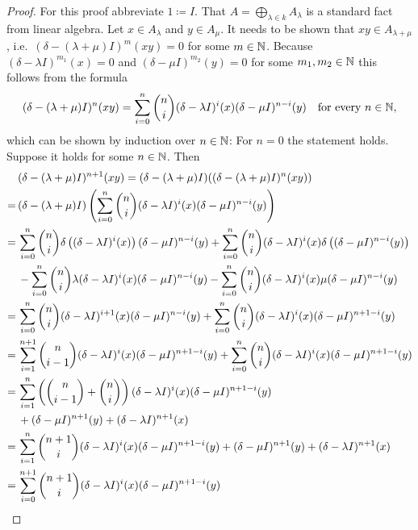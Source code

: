 \begin{proof}
 For this proof abbreviate $1 \coloneqq I$. That $A = \bigoplus_{\lambda \in k} A_\lambda$ is a standard fact from linear algebra. Let $x \in A_\lambda$ and $y \in A_\mu$. It needs to be shown that $xy \in A_{\lambda + \mu}$, i.e.\ $(\delta-(\lambda+\mu)I)^m(xy) = 0$ for some $m \in \mathbb{N}$. Because $(\delta-\lambda I)^{m_1}(x) = 0$ and $(\delta-\mu I)^{m_2}(y) = 0$ for some $m_1, m_2 \in \mathbb{N}$ this follows from the formula
 \[
  (\delta-(\lambda+\mu)I)^n(xy)
  = \sum_{i=0}^n \binom{n}{i} (\delta-\lambda I)^i(x) (\delta-\mu I)^{n-i}(y)
  \quad\text{for every $n \in \mathbb{N}$},
 \]
 which can be shown by induction over $n \in \mathbb{N}$: For $n = 0$ the statement holds. Suppose it holds for some $n \in \mathbb{N}$. Then
 \begin{align*}
  &\, (\delta-(\lambda+\mu)I)^{n+1}(xy)
  = (\delta-(\lambda+\mu)I)((\delta-(\lambda+\mu)I)^n(xy)) \\
  =&\, (\delta-(\lambda+\mu)I)\left(
       \sum_{i=0}^n \binom{n}{i} (\delta-\lambda I)^i(x) (\delta-\mu I)^{n-i}(y)
       \right) \\
  =&\,  \sum_{i=0}^n \binom{n}{i} \delta\left( (\delta-\lambda I)^i(x) \right) (\delta-\mu I)^{n-i}(y)
       +\sum_{i=0}^n \binom{n}{i} (\delta-\lambda I)^i(x) \delta\left( (\delta-\mu I)^{n-i}(y) \right) \\
   &\, -\sum_{i=0}^n \binom{n}{i} \lambda(\delta-\lambda I)^i(x) (\delta-\mu I)^{n-i}(y)
       -\sum_{i=0}^n \binom{n}{i} (\delta-\lambda I)^i(x) \mu(\delta-\mu I)^{n-i}(y) \\
  =&\,  \sum_{i=0}^n \binom{n}{i} (\delta-\lambda I)^{i+1}(x) (\delta-\mu I)^{n-i}(y)
       +\sum_{i=0}^n \binom{n}{i} (\delta-\lambda I)^i(x) (\delta-\mu I)^{n+1-i}(y) \\
  =&\,  \sum_{i=1}^{n+1} \binom{n}{i-1} (\delta-\lambda I)^i(x) (\delta-\mu I)^{n+1-i}(y)
       +\sum_{i=0}^n \binom{n}{i} (\delta-\lambda I)^i(x) (\delta-\mu I)^{n+1-i}(y) \\
  =&\,  \sum_{i=1}^n \left(\binom{n}{i-1}+\binom{n}{i}\right) (\delta-\lambda I)^i(x) (\delta-\mu I)^{n+1-i}(y) \\
   &\, +(\delta-\mu I)^{n+1}(y) + (\delta-\lambda I)^{n+1}(x) \\
  =&\,  \sum_{i=1}^n \binom{n+1}{i} (\delta-\lambda I)^i(x) (\delta-\mu I)^{n+1-i}(y)
       +(\delta-\mu I)^{n+1}(y) + (\delta-\lambda I)^{n+1}(x) \\
  =&\, \sum_{i=0}^{n+1} \binom{n+1}{i} (\delta-\lambda I)^i(x) (\delta-\mu I)^{n+1-i}(y)
 \qedhere
 \end{align*}
\end{proof}


